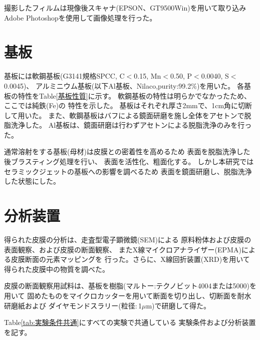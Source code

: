撮影したフィルムは現像後スキャナ(EPSON、GT9500Win)を用いて取り込み
Adobe\textregistered 
\newline
Photoshop\textregistered を使用して画像処理を行った。

\section{基板}

基板には軟鋼基板(G3141規格SPCC, C$<$0.15, Mn$<$0.50, P$<$0.0040, S$<$0.0045)、
アルミニウム基板(以下Al基板、Nilaco,purity:99.2\%)を用いた。
各基板の特性をTable\ref{基板性質}\cite{理化学辞典}に示す。
軟鋼基板の特性は明らかでなかったため、ここでは純鉄(Fe)の
特性を示した。
基板はそれぞれ厚さ2mmで、1cm角に切断して用いた。
また、軟鋼基板はバフによる鏡面研磨を施し全体をアセトンで脱脂洗浄した。
Al基板は、鏡面研磨は行わずアセトンによる脱脂洗浄のみを行った。

通常溶射をする基板(母材)は皮膜との密着性を高めるため
表面を脱脂洗浄した後ブラスティング処理を行い、
表面を活性化、粗面化する。
しかし本研究ではセラミックジェットの基板への影響を調べるため
表面を鏡面研磨し、脱脂洗浄した状態にした。

\section{分析装置} \label{sec:分析}

得られた皮膜の分析は、走査型電子顕微鏡(SEM)による
原料粉体および皮膜の表面観察、および皮膜の断面観察、
またX線マイクロアナライザー(EPMA)による皮膜断面の元素マッピングを
行った。さらに、X線回折装置(XRD)を用いて得られた皮膜中の物質を調べた。

皮膜の断面観察用試料は、基板を樹脂(マルトー:テクノビット4004または5000)を用いて
固めたものをマイクロカッターを用いて断面を切り出し、切断面を耐水研磨紙および
ダイヤモンドスラリー(粒径$:$1$\mu$m)で研磨して得た。

Table\ref{tab:実験条件共通}にすべての実験で共通している
実験条件および分析装置を記す。








